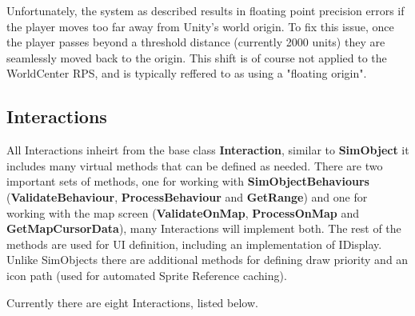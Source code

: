 \documentclass{report}
\begin{document}
Unfortunately, the system as described results in floating point precision errors if the player moves too far away from Unity's world origin. To fix this issue, once the player passes beyond a threshold distance (currently 2000 units) they are seamlessly moved back to the origin. This shift is of course not applied to the WorldCenter RPS, and is typically reffered to as using a "floating origin".

\subsection{Interactions}

All Interactions inheirt from the base class \textbf{Interaction}, similar to \textbf{SimObject} it includes many virtual methods that can be defined as needed. There are two important sets of methods, one for working with \textbf{SimObjectBehaviours} (\textbf{ValidateBehaviour}, \textbf{ProcessBehaviour} and \textbf{GetRange}) and one for working with the map screen (\textbf{ValidateOnMap}, \textbf{ProcessOnMap} and \textbf{GetMapCursorData}), many Interactions will implement both.
The rest of the methods are used for UI definition, including an implementation of IDisplay. Unlike SimObjects there are additional methods for defining draw priority and an icon path (used for automated Sprite Reference caching).

Currently there are eight Interactions, listed below.
\end{document}
